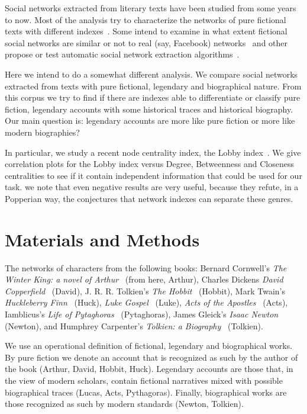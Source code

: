 \documentclass[review]{elsarticle}
\begin{document}
Social networks extracted from literary texts have been studied from some
years to now. Most of the analysis try to characterize the networks
of pure fictional texts with different 
indexes~\cite{choi2007directed,mac2012universal,
agarwal2012social,mac2013quantitative,
kenna2016maths,ribeiro2016complex}. 
Some intend to examine in what extent
fictional social networks are similar or not to real (say, Facebook)
networks~\cite{alberich2002marvel,gleiser2007become} 
and other propose or test automatic social network
extraction algorithms~\cite{elson2010extracting,grayson2016sense}. 

Here we intend to do a somewhat different analysis. We compare 
social networks extracted from texts with pure fictional, 
legendary and biographical nature. 
From this corpus we try to find if there are indexes able to
differentiate or classify pure fiction, legendary accounts with some 
historical traces and historical biography. Our main question is:
legendary accounts are more like pure fiction or more like
modern biographies?

In particular, we study a recent node centrality index, the Lobby 
index~\cite{korn2009lobby,campiteli2013lobby,lu2016h}. We give
correlation plots for the Lobby index versus Degree, Betweenness and 
Closeness centralities to see if it contain
independent information that could be used for our task.
we note that even negative results are very useful, because they
refute, in a Popperian way, the conjectures that network indexes
can separate these genres.

\section{Materials and Methods}
\label{Methods}

The networks of characters  from the following books:
Bernard Cornwell's \emph{The Winter King: a novel of
Arthur}~\cite{cornwell2007winter} (from here, Arthur),
Charles Dickens \emph{David Copperfield}~\citep{sgb} (David),
J. R. R. Tolkien's \emph{The Hobbit}~\cite{tolkien2012hobbit} (Hobbit), 
Mark Twain's \emph{Huckleberry Finn}~\citep{sgb} (Huck),
\emph{Luke Gospel}~\cite{holybible} (Luke), 
\emph{Acts of the Apostles}~\cite{holybible} (Acts), 
Iamblicus's \emph{Life of Pytaghoras}~\cite{taylor1986iamblichus}
(Pytaghoras), James Gleick's \emph{Isaac Newton}~\cite{gleick2003isaac}
(Newton), and Humphrey Carpenter's \emph{Tolkien: a
Biography}~\cite{carpenter2014jrr} (Tolkien). 

We use an operational definition of fictional, legendary and biographical
works. By pure fiction we denote an account that is recognized as such
by the author of the book (Arthur, David, Hobbit, Huck). 
Legendary accounts are those that, in the view of modern scholars,
contain fictional narratives mixed 
with possible biographical traces (Lucas, Acts, Pythagoras).
Finally, biographical works are those recognized as such by
modern standards (Newton, Tolkien). 
\end{document}
